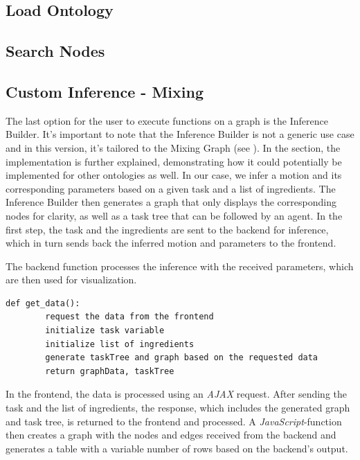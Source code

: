 \subsection{Load Ontology}

\subsection{Search Nodes}

\subsection{Custom Inference - Mixing}

The last option for the user to execute functions on a graph is the Inference Builder. 
It's important to note that the Inference Builder is not a generic use case and in this version, it's tailored to the Mixing Graph (see ). 
In the  section, the implementation is further explained, demonstrating how it could potentially be implemented for other ontologies as well. 
In our case, we infer a motion and its corresponding parameters based on a given task and a list of ingredients. 
The Inference Builder then generates a graph that only displays the corresponding nodes for clarity, as well as a task tree that can be followed by an agent.
In the first step, the task and the ingredients are sent to the backend for inference, which in turn sends back the inferred motion and parameters to the frontend.


The backend function processes the inference with the received parameters, which are then used for visualization.


\begin{lstlisting}[caption={Inference Builder pipeline},captionpos=b]
    def get_data():
        request the data from the frontend
        initialize task variable
        initialize list of ingredients
        generate taskTree and graph based on the requested data
        return graphData, taskTree
\end{lstlisting}
In the frontend, the data is processed using an \textit{AJAX} request. After sending the task and the list of ingredients, the response, which includes the generated graph and task tree, is returned to the frontend and processed. A \textit{JavaScript}-function then creates a graph with the nodes and edges received from the backend and generates a table with a variable number of rows based on the backend's output.

